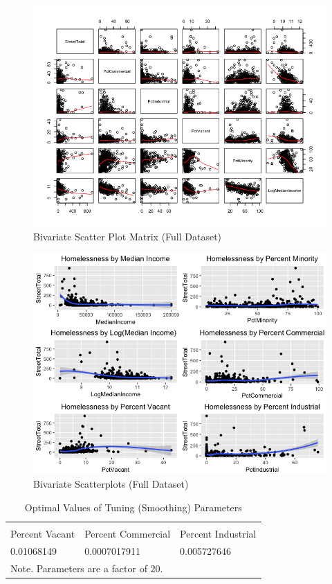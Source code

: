 \documentclass[titlepage]{article}   	%
\begin{document}
\begin{figure} [h]
\centering
\includegraphics[scale=.65]{ScatterMatrix}
\caption{Bivariate Scatter Plot Matrix (Full Dataset)}
\end{figure}

\begin{figure} [h]
\centering
\includegraphics[scale=.65]{Scatterplots}
\caption{Bivariate Scatterplots (Full Dataset)}
\end{figure}

\begin{table}[]
\centering
\caption{Optimal Values of Tuning (Smoothing) Parameters}
\label{my-label}
\begin{tabular}{@{}lll@{}}
\\[-1.8ex]\hline 
\hline \\[-1.8ex] 
Percent Vacant & Percent Commercial & Percent Industrial \\ \hline
0.01068149     & 0.0007017911       & 0.005727646       \\  \hline
\multicolumn{2}{p{.5\textwidth}}{Note. Parameters are a factor of 20.}
\end{tabular}
\end{table}
\end{document}
